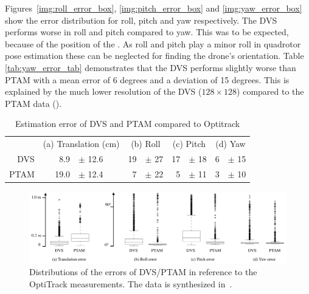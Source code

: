 Figures~\ref{img:roll_error_box}, \ref{img:pitch_error_box} and
\ref{img:yaw_error_box} show the error distribution for roll, pitch
and yaw respectively. The DVS performs worse in roll and pitch compared
to yaw. This was to be expected, because of the position of the \ALMs.
As roll and pitch play a minor roll in quadrotor pose estimation these
can be neglected for finding the drone's orientation. Table \ref{tab:yaw_error_tab}
demonstrates that the DVS performs slightly worse than PTAM with a
mean error of 6 degrees and a deviation of 15 degrees. This is explained
by the much lower resolution of the DVS ($128\times128$) compared
to the PTAM data (\xxx).

\begin{table}
\caption{\label{tab:Estimation-error}Estimation error of DVS and PTAM compared
to Optitrack}


\centering

\newcommand{\tmean}{mean\xspace}
\newcommand{\incm}{[cm]}
\newcommand{\indeg}{[$^\circ$]}
\newcommand{\tstd}{std.dev.\xspace}
\footnotesize

\begin{tabular}{r|rl|rl|rl|rl}
\multicolumn{1}{r}{} & \multicolumn{2}{c}{(a) Translation (cm)} & \multicolumn{2}{c}{(b) Roll } & \multicolumn{2}{c}{(c) Pitch} & \multicolumn{2}{c}{(d) Yaw}\tabularnewline
\cline{2-9} 
DVS\rule{0pt}{1em} & 8.9  & $\pm$ 12.6  & 19  & $\pm$ 27\textdegree{} & 17  & $\pm$ 18\textdegree{}  & 6  & $\pm$ 15\textdegree{}\tabularnewline
PTAM & 19.0 & $\pm$ 12.4  & 7  & $\pm$ 22\textdegree{} & 5  & $\pm$ 11\textdegree{}  & 3  & $\pm$ 10\textdegree{}\tabularnewline
\end{tabular}

\end{table}


\begin{figure}


\begin{centering}
\includegraphics[width=14cm]{figures/slides/errors}
\par\end{centering}

\caption{Distributions of the errors of DVS/PTAM in reference to the OptiTrack
measurements. The data is synthesized in~.}
\end{figure}



